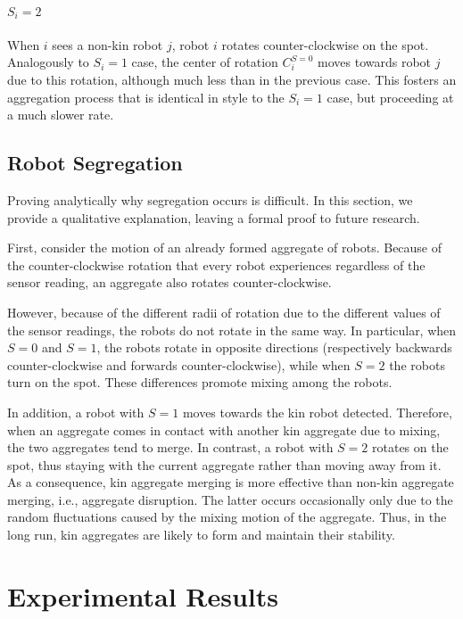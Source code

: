\documentclass[letterpaper, 10 pt, conference]{ieeeconf}
\begin{document}
\paragraph{$S_i = 2$}
When $i$ sees a non-kin robot $j$, robot $i$ rotates counter-clockwise on the
spot. Analogously to $S_i = 1$ case, the center of rotation $C^{S=0}_i$ moves
towards robot $j$ due to this rotation, although much less than in the previous
case. This fosters an aggregation process that is identical in style to the
$S_i = 1$ case, but proceeding at a much slower rate.

\subsection{Robot Segregation}
\label{subsec:analysis_aggregate}

Proving analytically why segregation occurs is difficult. In this section, we
provide a qualitative explanation, leaving a formal proof to future research.

First, consider the motion of an already formed aggregate of robots. Because of
the counter-clockwise rotation that every robot experiences regardless of the
sensor reading, an aggregate also rotates counter-clockwise.

However, because of the different radii of rotation due to the different values
of the sensor readings, the robots do not rotate in the same way. In particular,
when $S=0$ and $S=1$, the robots rotate in opposite directions (respectively
backwards counter-clockwise and forwards counter-clockwise), while when $S=2$
the robots turn on the spot. These differences promote mixing among the robots.

In addition, a robot with $S=1$ moves towards the kin robot detected. Therefore,
when an aggregate comes in contact with another kin aggregate due to mixing, the
two aggregates tend to merge. In contrast, a robot with $S=2$ rotates on the
spot, thus staying with the current aggregate rather than moving away from
it. As a consequence, kin aggregate merging is more effective than non-kin
aggregate merging, i.e., aggregate disruption. The latter occurs occasionally
only due to the random fluctuations caused by the mixing motion of the
aggregate. Thus, in the long run, kin aggregates are likely to form and maintain
their stability.

\section{Experimental Results}
\end{document}
